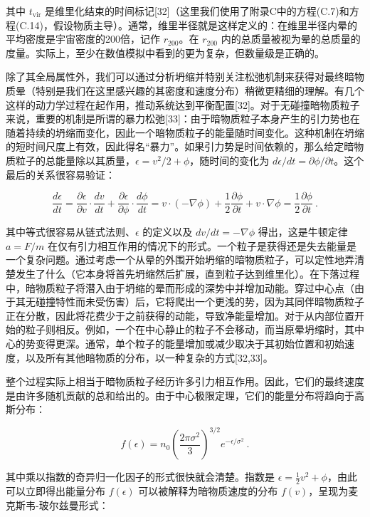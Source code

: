 其中 \(t_{\text{vir}}\) 是维里化结束的时间标记[32]（这里我们使用了附录C中的方程(C.7)和方程(C.14)，假设物质主导）。通常，维里半径就是这样定义的：在维里半径内晕的平均密度是宇宙密度的200倍，记作 \(r_{200}\)。在 \(r_{200}\) 内的总质量被视为晕的总质量的度量。实际上，至少在数值模拟中看到的更为复杂，但数量级是正确的。

除了其全局属性外，我们可以通过分析坍缩并特别关注松弛机制来获得对最终暗物质晕（特别是我们在这里感兴趣的其密度和速度分布）稍微更精细的理解。有几个这样的动力学过程在起作用，推动系统达到平衡配置[32]。对于无碰撞暗物质粒子来说，重要的机制是所谓的暴力松弛[33]：由于暗物质粒子本身产生的引力势也在随着持续的坍缩而变化，因此一个暗物质粒子的能量随时间变化。这种机制在坍缩的短时间尺度上有效，因此得名“暴力”。如果引力势是时间依赖的，那么给定暗物质粒子的总能量除以其质量，\(\epsilon = v^2/2 + \phi\)，随时间的变化为 \(d\epsilon/dt = \partial\phi/\partial t\)。这个最后的关系很容易验证：

\[ \frac{d\epsilon}{dt} = \frac{\partial\epsilon}{\partial v} \cdot \frac{dv}{dt} + \frac{\partial\epsilon}{\partial\phi} \cdot \frac{d\phi}{dt} = v \cdot (-\nabla\phi) + \frac{1}{2} \frac{\partial\phi}{\partial t} + v \cdot \nabla\phi = \frac{1}{2} \frac{\partial\phi}{\partial t}~. \]

其中等式很容易从链式法则、\(\epsilon\) 的定义以及 \(dv/dt = -\nabla\phi\) 得出，这是牛顿定律 \(a = F/m\) 在仅有引力相互作用的情况下的形式。一个粒子是获得还是失去能量是一个复杂问题。通过考虑一个从晕的外围开始坍缩的暗物质粒子，可以定性地弄清楚发生了什么（它本身将首先坍缩然后扩展，直到粒子达到维里化）。在下落过程中，暗物质粒子将潜入由于坍缩的晕而形成的深势中并增加动能。穿过中心点（由于其无碰撞特性而未受伤害）后，它将爬出一个更浅的势，因为其同伴暗物质粒子正在分散，因此将花费少于之前获得的动能，导致净能量增加。对于从内部位置开始的粒子则相反。例如，一个在中心静止的粒子不会移动，而当原晕坍缩时，其中心的势变得更深。通常，单个粒子的能量增加或减少取决于其初始位置和初始速度，以及所有其他暗物质的分布，以一种复杂的方式[32,33]。

整个过程实际上相当于暗物质粒子经历许多引力相互作用。因此，它们的最终速度是由许多随机贡献的总和给出的。由于中心极限定理，它们的能量分布将趋向于高斯分布：

\[ f(\epsilon) = n_0 \left(\frac{2\pi\sigma^2}{3}\right)^{3/2} e^{-\epsilon/\sigma^2} ~. \]

其中乘以指数的奇异归一化因子的形式很快就会清楚。指数是 \(\epsilon = \frac{1}{2}v^2 + \phi\)，由此可以立即得出能量分布 \(f(\epsilon)\) 可以被解释为暗物质速度的分布 \(f(v)\)，呈现为麦克斯韦-玻尔兹曼形式：

